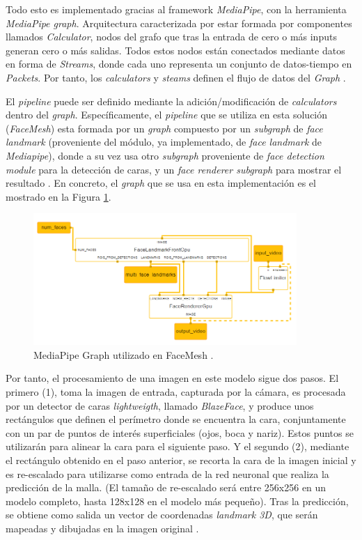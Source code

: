 Todo esto es implementado gracias al framework \textit{MediaPipe}, con la herramienta \textit{MediaPipe graph}. Arquitectura caracterizada por estar formada por componentes llamados \textit{Calculator}, nodos del grafo que tras la entrada de cero o más inputs generan cero o más salidas. Todos estos nodos están conectados mediante datos en forma de \textit{Streams}, donde cada uno representa un conjunto de datos-tiempo en \textit{Packets}. Por tanto, los \textit{calculators} y \textit{steams} definen el flujo de datos del \textit{Graph} \cite{mediapipe}.

El \textit{pipeline} puede ser definido mediante la adición/modificación de \textit{calculators} dentro del \textit{graph}. Específicamente, el \textit{pipeline} que se utiliza en esta solución (\textit{FaceMesh}) esta formada por un \textit{graph} compuesto por un \textit{subgraph} de \textit{face landmark} (proveniente del módulo, ya implementado, de \textit{face landmark} de \textit{Mediapipe}), donde a su vez usa otro \textit{subgraph} proveniente de \textit{face detection module} para la detección de caras, y un \textit{face renderer subgraph} para mostrar el resultado \cite{faceMesh}. En concreto, el \textit{graph} que se usa en esta implementación es el mostrado en la Figura \ref{fig:faceMesh}.

\begin{figure}[htp]
	\centering
	\includegraphics[width=10cm]{imagenes/faceMesh.png}
	\caption[MediaPipe Graph utilizado en FaceMesh.]{MediaPipe Graph utilizado en FaceMesh \cite{mpGraph}.}
	\label{fig:faceMesh}
\end{figure}

Por tanto, el procesamiento de una imagen en este modelo sigue dos pasos. El primero (1), toma la imagen de entrada, capturada por la cámara, es procesada por un detector de caras \textit{lightweigth}, llamado \textit{BlazeFace}, y produce unos rectángulos que definen el perímetro donde se encuentra la cara, conjuntamente con un par de puntos de interés superficiales (ojos, boca y nariz). Estos puntos se utilizarán para alinear la cara para el siguiente paso. Y el segundo (2), mediante el rectángulo obtenido en el paso anterior, se recorta la cara de la imagen inicial y es re-escalado para utilizarse como entrada de la red neuronal que realiza la predicción de la malla. (El tamaño de re-escalado será entre 256x256 en un modelo completo, hasta 128x128 en el modelo más pequeño). Tras la predicción, se obtiene como salida un vector de coordenadas \textit{landmark 3D}, que serán mapeadas y dibujadas en la imagen original \cite{faceMesh2}. 

